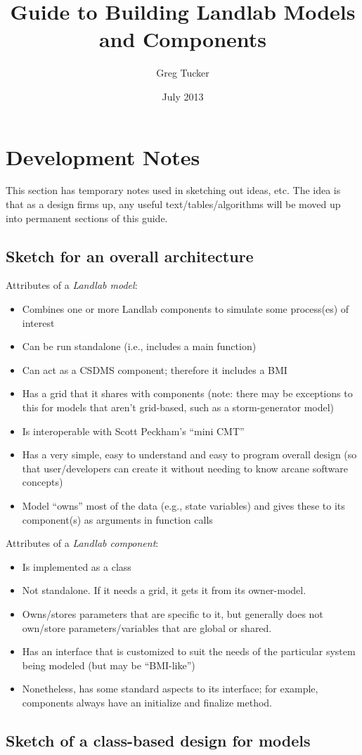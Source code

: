 \documentclass[12pt]{amsart}
\title{Guide to Building Landlab Models and Components}
\author{Greg Tucker}
\date{July 2013} %
\begin{document}
\maketitle

\section{Development Notes}

This section has temporary notes used in sketching out ideas, etc. The idea is that as a design firms up, any useful text/tables/algorithms will be moved up into permanent sections of this guide.

\subsection{Sketch for an overall architecture}

Attributes of a {\em Landlab model}:
\begin{itemize}
\item Combines one or more Landlab components to simulate some process(es) of interest
\item Can be run standalone (i.e., includes a main function)
\item Can act as a CSDMS component; therefore it includes a BMI
\item Has a grid that it shares with components (note: there may be exceptions to this for models that aren't grid-based, such as a storm-generator model)
\item Is interoperable with Scott Peckham's ``mini CMT''
\item Has a very simple, easy to understand and easy to program overall design (so that user/developers can create it without needing to know arcane software concepts)
\item Model ``owns'' most of the data (e.g., state variables) and gives these to its component(s) as arguments in function calls
\end{itemize}

Attributes of a {\em Landlab component}:
\begin{itemize}
\item Is implemented as a class
\item Not standalone. If it needs a grid, it gets it from its owner-model.
\item Owns/stores parameters that are specific to it, but generally does not own/store parameters/variables that are global or shared.
\item Has an interface that is customized to suit the needs of the particular system being modeled (but may be ``BMI-like'')
\item Nonetheless, has some standard aspects to its interface; for example, components always have an initialize and finalize method.
\end{itemize}


\subsection{Sketch of a class-based design for models}



	
			
\end{document}
